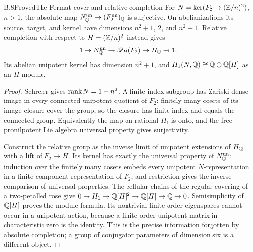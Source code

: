 \begin{statement}{B.8}{Proved}{The Fermat cover and relative completion}
For $N=\ker(F_2\to(\mathbb Z/n)^2)$, $n>1$, the absolute map
$N^{\mathrm{un}}_\mathbb Q\to (F_2^{\mathrm{un}})_\mathbb Q$ is surjective. On abelianizations
its source, target, and kernel have dimensions $n^2+1$, $2$,
and $n^2-1$. Relative completion with respect to
$H=(\mathbb Z/n)^2$ instead gives
\[
 1\to N^{\mathrm{un}}_\mathbb Q\to\mathscr R_H(F_2)\to H_\mathbb Q\to1.
\]
Its abelian unipotent kernel has dimension $n^2+1$, and
$H_1(N,\mathbb Q)\cong\mathbb Q\oplus\mathbb Q[H]$ as an $H$-module.
\end{statement}
\begin{proof}
Schreier gives $\operatorname{rank} N=1+n^2$. A finite-index subgroup has
Zariski-dense image in every connected unipotent quotient of
$F_2$: finitely many cosets of its image closure cover the group,
so the closure has finite index and equals the connected group.
Equivalently the map on rational $H_1$ is onto, and the free
pronilpotent Lie algebra universal property gives surjectivity.

Construct the relative group as the inverse limit of unipotent
extensions of $H_\mathbb Q$ with a lift of $F_2\to H$. Its kernel
has exactly the universal property of $N^{\mathrm{un}}_\mathbb Q$: induction
over the finitely many cosets embeds every unipotent
$N$-representation in a finite-component representation of
$F_2$, and restriction gives the inverse comparison of
universal properties. The cellular chains of the regular
covering of a two-petalled rose give
$0\to H_1\to\mathbb Q[H]^2\to\mathbb Q[H]\to\mathbb Q\to0$.
Semisimplicity of $\mathbb Q[H]$ proves the module formula.
Its nontrivial finite-order eigenspaces cannot occur in a
unipotent action, because a finite-order unipotent matrix in
characteristic zero is the identity. This is the precise
information forgotten by absolute completion; a group of
conjugator parameters of dimension six is a different object.
\end{proof}


